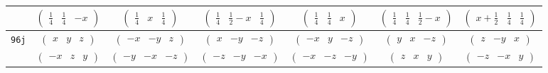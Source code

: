 \documentclass[fleqn,9pt,landscape]{jsarticle}
\begin{document}
\begin{center}
\begin{longtable}{ccccccc}
& $ \begin{pmatrix} \frac{1}{4} & \frac{1}{4} & - x \end{pmatrix} $ & $ \begin{pmatrix} \frac{1}{4} & x & \frac{1}{4} \end{pmatrix} $ & $ \begin{pmatrix} \frac{1}{4} & \frac{1}{2} - x & \frac{1}{4} \end{pmatrix} $ & $ \begin{pmatrix} \frac{1}{4} & \frac{1}{4} & x \end{pmatrix} $ & $ \begin{pmatrix} \frac{1}{4} & \frac{1}{4} & \frac{1}{2} - x \end{pmatrix} $ & $ \begin{pmatrix} x + \frac{1}{2} & \frac{1}{4} & \frac{1}{4} \end{pmatrix} $ \\ \hline
{\tt 96j} & $ \begin{pmatrix} x & y & z \end{pmatrix} $ & $ \begin{pmatrix} - x & - y & z \end{pmatrix} $ & $ \begin{pmatrix} x & - y & - z \end{pmatrix} $ & $ \begin{pmatrix} - x & y & - z \end{pmatrix} $ & $ \begin{pmatrix} y & x & - z \end{pmatrix} $ & $ \begin{pmatrix} z & - y & x \end{pmatrix} $ \\
& $ \begin{pmatrix} - x & z & y \end{pmatrix} $ & $ \begin{pmatrix} - y & - x & - z \end{pmatrix} $ & $ \begin{pmatrix} - z & - y & - x \end{pmatrix} $ & $ \begin{pmatrix} - x & - z & - y \end{pmatrix} $ & $ \begin{pmatrix} z & x & y \end{pmatrix} $ & $ \begin{pmatrix} - z & - x & y \end{pmatrix} $ \\

\end{longtable}
\end{center}
\end{document}
